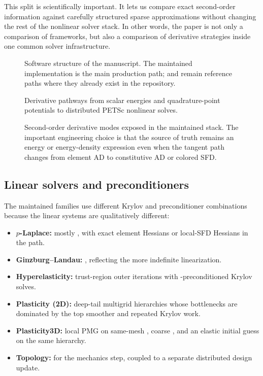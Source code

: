 This split is scientifically important. It lets us compare exact second-order
information against carefully structured sparse approximations without changing
the rest of the nonlinear solver stack. In other words, the paper is not only a
comparison of frameworks, but also a comparison of derivative strategies inside
one common solver infrastructure.

\begin{figure}[H]
  \centering
  \PaperFrameworkOverviewDiagram
  \caption{Software structure of the manuscript. The maintained \jaxpetsc{}
  implementation is the main production path; \purejax{} and \fenics{} remain
  reference paths where they already exist in the repository.}
  \label{fig:framework-overview}
\end{figure}

\begin{figure}[H]
  \centering
  \PaperDerivativePathDiagram
  \caption{Derivative pathways from scalar energies and quadrature-point
  potentials to distributed PETSc nonlinear solves.}
  \label{fig:derivative-pathways}
\end{figure}

\begin{figure}[H]
  \centering
  \PaperAutodiffModesDiagram
  \caption{Second-order derivative modes exposed in the maintained stack. The
  important engineering choice is that the source of truth remains an energy or
  energy-density expression even when the tangent path changes from element AD
  to constitutive AD or colored SFD.}
  \label{fig:derivative-stack}
\end{figure}

\subsection{Linear solvers and preconditioners}

The maintained families use different Krylov and preconditioner combinations
because the linear systems are qualitatively different:
\begin{itemize}
  \item \textbf{$p$-Laplace:} mostly , with exact element
        Hessians or local-SFD Hessians in the \jaxpetsc{} path.
  \item \textbf{Ginzburg--Landau:} , reflecting the more
        indefinite linearization.
  \item \textbf{Hyperelasticity:} trust-region outer iterations with
        -preconditioned Krylov solves.
  \item \textbf{Plasticity (2D):} deep-tail multigrid hierarchies whose
        bottlenecks are dominated by the top smoother and repeated Krylov
        work.
  \item \textbf{Plasticity3D:} local PMG on same-mesh
        , coarse , and an elastic initial
        guess on the same hierarchy.
  \item \textbf{Topology:}  for the mechanics step, coupled
        to a separate distributed design update.
\end{itemize}


